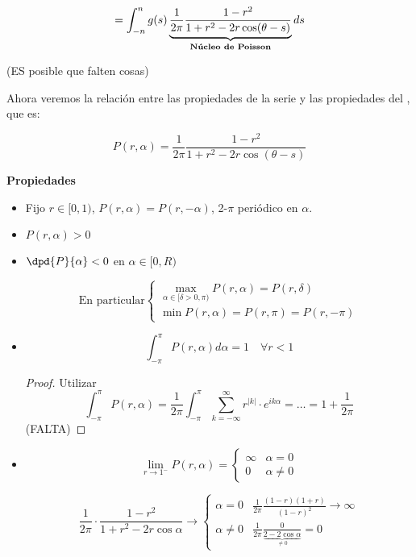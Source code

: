 		\[ = \int^{n}_{-n} g(s) \underbrace{\frac{1}{2\pi} \frac{1-r^2}{1+r^2-2r\cos (\theta - s)}}_{\text{\bf Núcleo de Poisson}} ds \]

		(ES posible que falten cosas)

		Ahora veremos la relación entre las propiedades de la serie y las propiedades del , que es:

		\[P(r,\alpha) = \frac{1}{2\pi} \frac{1-r^2}{1+r^2-2r\cos (\theta - s)} \]


		\textbf{Propiedades}

		\begin{itemize}

			\item Fijo $r \in [0,1)$, $P(r,\alpha) = P(r,-\alpha)$, 2-$\pi$ periódico en $\alpha$.

			\item $P(r,\alpha) > 0$

			\item $\dpd{P}{\alpha} < 0$ en $\alpha \in [0,R)$

			\[ \text{En particular} \begin{cases}
				\max_{\alpha \in [\delta > 0, \pi)} P(r,\alpha) = P(r,\delta) \\
				\min P(r,\alpha) = P(r,\pi) = P(r,-\pi)
			\end{cases} \]

			\item \[
				\int_{-\pi}^\pi P(r, \alpha) d\alpha = 1 \quad \forall r < 1
			\]

			\begin{proof}
				Utilizar \[ \int_{-\pi}^\pi P(r, \alpha) = \frac{1}{2\pi} \int_{-\pi}^\pi \sum_{k=-\infty}^{\infty} r^{|k|} \cdot e^{ik\alpha}  = … = 1 + \frac{1}{2\pi}  \]
				(FALTA)
			\end{proof}


			\item \[
			\lim_{r \to 1^-} P(r, \alpha) = \begin{cases}
				\infty & \alpha = 0 \\
				0 & \alpha \neq 0
			\end{cases}
			\]

			\[
				\frac{1}{2\pi} \cdot \frac{1-r^2}{1+r^2-2r\cos \alpha} \rightarrow \begin{cases}
				\alpha = 0 & \frac{1}{2\pi} \frac{(1-r)(1+r)}{(1-r)^2} \rightarrow \infty \\
				\alpha \neq 0  & \frac{1}{2\pi} \frac{0}{\underbrace{2-2\cos \alpha}_{\neq 0}} = 0
				\end{cases}
			\]


\end{itemize}
